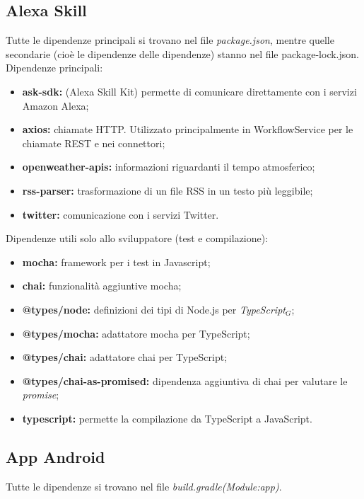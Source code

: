 \subsection{Alexa Skill}\label{ATecnologie}
Tutte le dipendenze principali si trovano nel file \textit{package.json}, mentre quelle secondarie (cioè le dipendenze delle dipendenze) stanno nel file package-lock.json.\\
Dipendenze principali:
\begin{itemize}
    \item \textbf{ask-sdk:} (Alexa Skill Kit) permette di comunicare direttamente con i servizi Amazon Alexa;
    \item \textbf{axios:} chiamate HTTP. Utilizzato principalmente in WorkflowService per le chiamate REST e nei connettori;
    \item \textbf{openweather-apis:} informazioni riguardanti il tempo atmosferico;
    \item \textbf{rss-parser:} trasformazione di un file RSS in un testo più leggibile;
    \item \textbf{twitter:} comunicazione con i servizi Twitter.
\end{itemize}
Dipendenze utili solo allo sviluppatore (test e compilazione):
\begin{itemize}
    \item \textbf{mocha:} framework per i test in Javascript;
    \item \textbf{chai:} funzionalità aggiuntive mocha;
    \item \textbf{@types/node:} definizioni dei tipi di Node.js per \textit{TypeScript$_{G}$};
    \item \textbf{@types/mocha:} adattatore mocha per TypeScript; 
    \item \textbf{@types/chai:} adattatore chai per TypeScript;
    \item \textbf{@types/chai-as-promised:} dipendenza aggiuntiva di chai per valutare le \textit{promise};
    \item \textbf{typescript:} permette la compilazione da TypeScript a JavaScript.
\end{itemize}

\subsection{App Android}

Tutte le dipendenze si trovano nel file \textit{build.gradle(Module:app)}.\\

